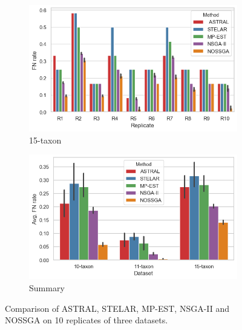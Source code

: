 \begin{figure}[!htbp]
\begin{adjustwidth}{-1cm}{}
	\begin{subfigure}[b]{0.55\textwidth}
		\includegraphics[width=\textwidth]{Figure/15-taxon_10_replicates}
		\caption{15-taxon}
	\end{subfigure}
	\begin{subfigure}[b]{0.55\textwidth}
		\includegraphics[width=\textwidth]{Figure/all_dataset_compare}
		\caption{Summary}
	\end{subfigure}%

	\caption{Comparison of ASTRAL, STELAR, MP-EST, NSGA-II and NOSSGA on 10 replicates of three datasets.}
	\label{fig:datasets}
\end{adjustwidth}
\end{figure}
